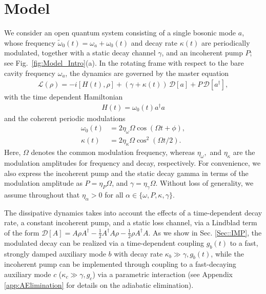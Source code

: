 \documentclass[a4paper,twocolumn,floatfix,10pt,superscriptaddress]%
{quantumarticle}
\newcommand{\mcl}[1]{\mathcal{#1}}
\newcommand{\mcL}{{\mcl{L}}}
\begin{document}
\section{Model} We consider an open quantum system consisting of a single bosonic mode $a$, whose frequency $\tilde{\omega}_0(t)=\omega_a+\omega_0(t)$ and decay rate $\kappa(t)$ are periodically modulated, together with a static decay channel $\gamma$, and an incoherent pump $P$; see Fig.~\ref{fig:Model_Intro}(a). In the rotating frame with respect to the bare cavity frequency $\omega_a$, the dynamics are governed by the master equation 
\begin{align}
\mcL(\rho) = -i[H(t), \rho] + (\gamma+\kappa(t))\, \mcl{D}[a]+ P\, \mcl{D}[a^\dag],
\end{align}
with the time dependent Hamiltonian 
\begin{align}
    H(t)=
    \omega_0(t)a^\dagger a
\end{align}
and the coherent periodic modulations 
\begin{align}
    \omega_0(t) &= 2 \eta_\omega \Omega \cos(\Omega t + \phi),\\\kappa(t)&=2\eta_\kappa \Omega \cos^2(\Omega t/2).
\end{align} Here, $\Omega$ denotes the common modulation frequency, whereas $\eta_\omega,$ and $\eta_\kappa$ are the modulation amplitudes for frequency and decay, respectively. For convenience, we also express the incoherent pump and the static decay gamma in terms of the modulation amplitude as $P=\eta_P \Omega$, and $\gamma=\eta_\gamma\Omega$.
 Without loss of generality, we assume throughout that $\eta_\alpha>0$ for all $\alpha\in \{\omega, P, \kappa, \gamma\}$.

The dissipative dynamics takes into account the effects of a time-dependent decay rate, a constant incoherent pump, and a static loss channel, via a Lindblad term of the form $\mcl{D}[A] = A \rho A^\dag - \tfrac{1}{2} A^\dag A \rho - \tfrac{1}{2} \rho A^\dag A$. As we show in Sec. \ref{Sec::IMP}, the modulated decay can be realized via a time-dependent coupling $g_b(t)$ to a fast, strongly damped auxiliary mode $b$ with decay rate $\kappa_b \gg \gamma, g_b(t)$, while the incoherent pump can be implemented through coupling to a fast-decaying auxiliary mode $c$ ($\kappa_c \gg \gamma, g_c$) via a parametric interaction (see Appendix \ref{app:AElimination} for details on the adiabatic elimination).
 
\end{document}

